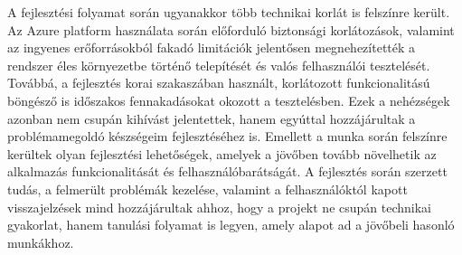 A fejlesztési folyamat során ugyanakkor több technikai korlát is felszínre került. Az Azure platform használata során előforduló biztonsági korlátozások, valamint az ingyenes erőforrásokból fakadó limitációk jelentősen megnehezítették a rendszer éles környezetbe történő telepítését és valós felhasználói tesztelését. Továbbá, a fejlesztés korai szakaszában használt, korlátozott funkcionalitású böngésző is időszakos fennakadásokat okozott a tesztelésben. Ezek a nehézségek azonban nem csupán kihívást jelentettek, hanem egyúttal hozzájárultak a problémamegoldó készségeim fejlesztéséhez is. Emellett a munka során felszínre kerültek olyan fejlesztési lehetőségek, amelyek a jövőben tovább növelhetik az alkalmazás funkcionalitását és felhasználóbarátságát. A fejlesztés során szerzett tudás, a felmerült problémák kezelése, valamint a felhasználóktól kapott visszajelzések mind hozzájárultak ahhoz, hogy a projekt ne csupán technikai gyakorlat, hanem tanulási folyamat is legyen, amely alapot ad a jövőbeli hasonló munkákhoz.





